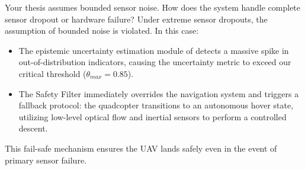 \begin{questionbox}{Your thesis assumes bounded sensor noise. How does the system handle complete sensor dropout or hardware failure?}
Under extreme sensor dropouts, the assumption of bounded noise is violated. In this case:
\begin{itemize}
  \item The epistemic uncertainty estimation module of  detects a massive spike in out-of-distribution indicators, causing the uncertainty metric to exceed our critical threshold ($\theta_{max} = 0.85$).
  \item The  Safety Filter immediately overrides the navigation system and triggers a fallback protocol: the quadcopter transitions to an autonomous hover state, utilizing low-level optical flow and inertial sensors to perform a controlled descent.
\end{itemize}
This fail-safe mechanism ensures the UAV lands safely even in the event of primary sensor failure.
\end{questionbox}